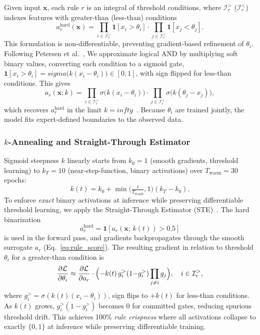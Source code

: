 \documentclass[journal]{IEEEtran}
\begin{document}
Given input $\mathbf{x}$, each rule $r$ is an integral of threshold conditions, where $\mathcal{I}_r^{>}$ ($\mathcal{I}_r^{<}$) indexes features with greater-than (less-than) conditions
\[
  a_r^{\mathrm{hard}}(\mathbf{x}) =
    \prod_{i\in\mathcal{I}_r^{>}}\!\mathbf{1}[x_i{>}\theta_i]\cdot
    \prod_{j\in\mathcal{I}_r^{<}}\!\mathbf{1}[x_j{<}\theta_j].
\]
This formulation is non-differentiable, preventing gradient-based refinement of $\theta_i$. Following Petersen et al.~\cite{petersen2022logic}, We approximate logical AND by multiplying soft binary values, converting each condition to a sigmoid gate, $\mathbf{1}[x_i{>}\theta_i] = sigma\!\bigl(k(x_i{-}\theta_i)\bigr)\in[0,1]$, with sign flipped for less-than conditions. This gives
\begin{equation}
  a_r(\mathbf{x};k) =
    \prod_{i\in\mathcal{I}_r^{>}}\!\sigma\!\bigl(k(x_i{-}\theta_i)\bigr)\cdot
    \prod_{j\in\mathcal{I}_r^{<}}\!\sigma\!\bigl(k(\theta_j{-}x_j)\bigr),
  \label{eq:rule_score}
\end{equation}
which recovers $a_r^{\mathrm{hard}}$ in the limit $k = infty$~\cite{yang2022ste}. Because $\theta_i$ are trained jointly, the model fits expert-defined boundaries to the observed data.

\subsubsection{\texorpdfstring{$k$}{k}-Annealing and Straight-Through Estimator}

Sigmoid steepness $k$ linearly starts from $k_0{=}1$ (smooth gradients, threshold learning) to $k_T{=}10$ (near-step-function, binary activations) over $T_{\mathrm{warm}}{=}30$ epochs:
\begin{equation}
  k(t) = k_0 + \min\!\bigl(\tfrac{t}{T_{\mathrm{warm}}},1\bigr)(k_T{-}k_0).
\end{equation}
To enforce \emph{exact} binary activations at inference while preserving differentiable threshold learning, we apply the Straight-Through Estimator (STE)~\cite{bengio2013ste,liu2023reinmax}. The hard binarization
\begin{equation}
  a_r^{\mathrm{hard}} = \mathbf{1}[a_r(\mathbf{x};\,k(t)) > 0.5]
\end{equation} is used in the forward pass, and gradients backpropagates through the smooth surrogate $a_r$ (Eq.~\ref{eq:rule_score}). The resulting gradient in relation to threshold $\theta_i$ for a greater-than condition is
\begin{equation}
  \frac{\partial \mathcal{L}}{\partial \theta_i} \approx
    \frac{\partial \mathcal{L}}{\partial a_r} \cdot
    \Bigl(-k(t)\,g_i^{>}(1{-}g_i^{>})\prod_{j \neq i} g_j\Bigr),
    \quad i\in\mathcal{I}_r^{>},
\end{equation}
where $g_i^{>}{=}\sigma(k(t)(x_i{-}\theta_i))$, sign flips to $+k(t)$ for less-than conditions. As $k(t)$ grows, $g_i^{>}(1{-}g_i^{>})$ becomes $0$ for committed gates, reducing spurious threshold drift. This achieves 100\% \emph{rule crispness} where all activations collapse to exactly $\{0,1\}$ at inference while preserving differentiable training.
\end{document}
